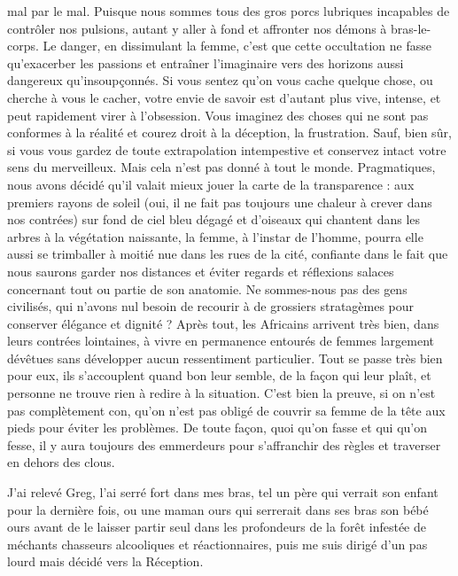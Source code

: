 mal par le mal. Puisque nous sommes tous des gros porcs lubriques incapables de contrôler nos pulsions, autant y aller à fond et affronter nos démons à bras-le-corps. Le danger, en dissimulant la femme, c’est que cette occultation ne fasse qu’exacerber les passions et entraîner l’imaginaire vers des horizons aussi dangereux qu’insoupçonnés. Si vous sentez qu’on vous cache quelque chose, ou cherche à vous le cacher, votre envie de savoir est d’autant plus vive, intense, et peut rapidement virer à l’obsession. Vous imaginez des choses qui ne sont pas conformes à la réalité et courez droit à la déception, la frustration. Sauf, bien sûr, si vous vous gardez de toute extrapolation intempestive et conservez intact votre sens du merveilleux. Mais cela n’est pas donné à tout le monde. Pragmatiques, nous avons décidé qu’il valait mieux jouer la carte de la transparence : aux premiers rayons de soleil (oui, il ne fait pas toujours une chaleur à crever dans nos contrées) sur fond de ciel bleu dégagé et d’oiseaux qui chantent dans les arbres à la végétation naissante, la femme, à l’instar de l’homme, pourra elle aussi se trimballer à moitié nue dans les rues de la cité, confiante dans le fait que nous saurons garder nos distances et éviter regards et réflexions salaces concernant tout ou partie de son anatomie. Ne sommes-nous pas des gens civilisés, qui n’avons nul besoin de recourir à de grossiers stratagèmes pour conserver élégance et dignité ? Après tout, les Africains arrivent très bien, dans leurs contrées lointaines, à vivre en permanence entourés de femmes largement dévêtues sans développer aucun ressentiment particulier. Tout se passe très bien pour eux, ils s’accouplent quand bon leur semble, de la façon qui leur plaît, et personne ne trouve rien à redire à la situation. C’est bien la preuve, si on n’est pas complètement con, qu’on n’est pas obligé de couvrir sa femme de la tête aux pieds pour éviter les problèmes. De toute façon, quoi qu’on fasse et qui qu’on fesse, il y aura toujours des emmerdeurs pour s’affranchir des règles et traverser en dehors des clous.

J’ai relevé Greg, l’ai serré fort dans mes bras, tel un père qui verrait son enfant pour la dernière fois, ou une maman ours qui serrerait dans ses bras son bébé ours avant de le laisser partir seul dans les profondeurs de la forêt infestée de méchants chasseurs alcooliques et réactionnaires, puis me suis dirigé d’un pas lourd mais décidé vers la Réception.


